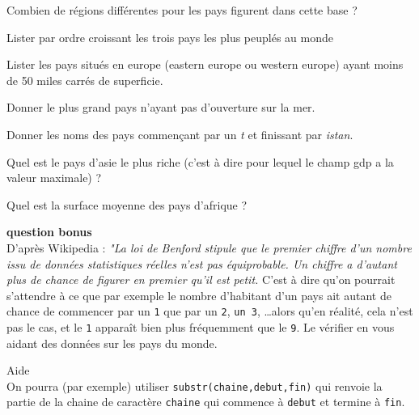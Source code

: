 \documentclass[11pt,a4paper]{article}
\begin{document}
\item Combien de régions différentes pour les pays figurent dans cette base ?
\item Lister par ordre croissant les trois pays les plus peuplés au monde
\item Lister les pays situés en europe ({\sc eastern europe} ou {\sc western europe})  ayant moins de 50 miles carrés de superficie.
\item Donner le plus grand pays n'ayant pas d'ouverture sur la mer.
\item Donner les noms des pays commençant par un \textit{t} et finissant par \textit{istan}.
\item Quel est le pays d'asie le plus riche (c'est à dire pour lequel le champ {\sc gdp} a la valeur maximale) ?
\item Quel est la surface moyenne des pays d'afrique  ? 
\FinListe
\item \textbf{question bonus} \\
D'après Wikipedia : \textit{"La loi de Benford stipule que le premier chiffre d'un nombre issu de données statistiques réelles n'est pas équiprobable. Un chiffre a d'autant plus de chance de figurer en premier qu'il est petit.}
C'est à dire qu'on pourrait s'attendre à ce que par exemple le nombre d'habitant d'un pays ait autant de chance de commencer par un {\tt 1} que par un {\tt 2}, {\tt un 3}, \dots alors qu'en réalité, cela n'est pas le cas, et le {\tt 1} apparaît bien plus fréquemment que le {\tt 9}. Le vérifier en vous aidant des données sur les pays du monde.

\aide \; Aide \\
On pourra (par exemple) utiliser {\tt substr(chaine,debut,fin)} qui renvoie la partie de la chaine de caractère {\tt chaine} qui commence à {\tt debut} et termine à {\tt fin}. 

\FinListe
\end{document}
